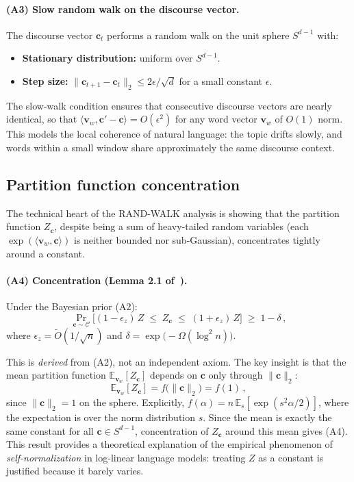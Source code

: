 \documentclass[11pt]{article}
\newcommand{\vw}{\bm{v}}
\begin{document}
\paragraph{(A3) Slow random walk on the discourse vector.} The discourse vector $\bm{c}_t$ performs a random walk on the unit sphere $S^{d-1}$ with:
\begin{itemize}
    \item \textbf{Stationary distribution:} uniform over $S^{d-1}$.
    \item \textbf{Step size:} $\|\bm{c}_{t+1} - \bm{c}_t\|_2 \leq 2\epsilon / \sqrt{d}$ for a small constant $\epsilon$.
\end{itemize}
The slow-walk condition ensures that consecutive discourse vectors are nearly identical, so that $\langle \vw_w, \bm{c}' - \bm{c} \rangle = O(\epsilon^2)$ for any word vector $\vw_w$ of $O(1)$ norm. This models the local coherence of natural language: the topic drifts slowly, and words within a small window share approximately the same discourse context.

\subsection{Partition function concentration}

The technical heart of the RAND-WALK analysis is showing that the partition function $Z_{\bm{c}}$, despite being a sum of heavy-tailed random variables (each $\exp(\langle \vw_w, \bm{c} \rangle)$ is neither bounded nor sub-Gaussian), concentrates tightly around a constant.

\paragraph{(A4) Concentration (Lemma 2.1 of~\cite{arora2016}).} Under the Bayesian prior (A2):
\begin{equation}\label{eq:rw-concentration}
    \Pr_{\bm{c} \sim \mathcal{C}}\!\Big[(1 - \epsilon_z)\, Z \;\leq\; Z_{\bm{c}} \;\leq\; (1 + \epsilon_z)\, Z\Big] \;\geq\; 1 - \delta\,,
\end{equation}
where $\epsilon_z = \tilde{O}(1/\sqrt{n})$ and $\delta = \exp\!\big(-\Omega(\log^2 n)\big)$.

This is \emph{derived} from (A2), not an independent axiom. The key insight is that the mean partition function $\mathbb{E}_{\vw_w}[Z_{\bm{c}}]$ depends on $\bm{c}$ only through $\|\bm{c}\|_2$:
\begin{equation}\label{eq:rw-mean-Z}
    \mathbb{E}_{\vw_w}[Z_{\bm{c}}] = f\!\big(\|\bm{c}\|_2\big) = f(1)\,,
\end{equation}
since $\|\bm{c}\|_2 = 1$ on the sphere. Explicitly, $f(\alpha) = n\,\mathbb{E}_s[\exp(s^2 \alpha / 2)]$, where the expectation is over the norm distribution $s$. Since the mean is exactly the same constant for all $\bm{c} \in S^{d-1}$, concentration of $Z_{\bm{c}}$ around this mean gives (A4). This result provides a theoretical explanation of the empirical phenomenon of \emph{self-normalization} in log-linear language models: treating $Z$ as a constant is justified because it barely varies.
\end{document}

